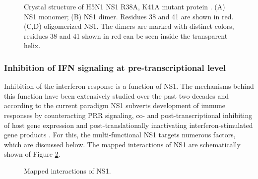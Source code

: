 		\begin{figure}[h]
			\centering
			\caption{Crystal structure of H5N1 NS1 R38A, K41A mutant protein \parencite{Bornholdt2008}. (A) NS1 monomer; (B) NS1 dimer. Residues 38 and 41 are shown in red. (C,D) oligomerized NS1. The dimers are marked with distinct colors, residues 38 and 41 shown in red can be seen inside the transparent helix. } \label{fig:structure}
		\end{figure}
		
	
		\subsubsection{Inhibition of IFN signaling at pre-transcriptional level} \label{sec:pre-transcriptional}
		
		Inhibition of the interferon response is a function of NS1. The mechanisms behind this function have been extensively studied over the past two decades and according to the current paradigm NS1 subverts development of immune responses by counteracting PRR signaling, co- and post-transcriptional inhibiting of host gene expression and post-translationally inactivating  interferon-stimulated gene products \parencite{Ayllon2014}.	For this, the multi-functional NS1 targets numerous factors, which are discussed below. The mapped interactions of NS1 are schematically shown of Figure \ref{fig:NS1}.
		
		\begin{figure}[h]
			\centering
			\caption{Mapped interactions of NS1.} \label{fig:NS1}
		\end{figure}
				
